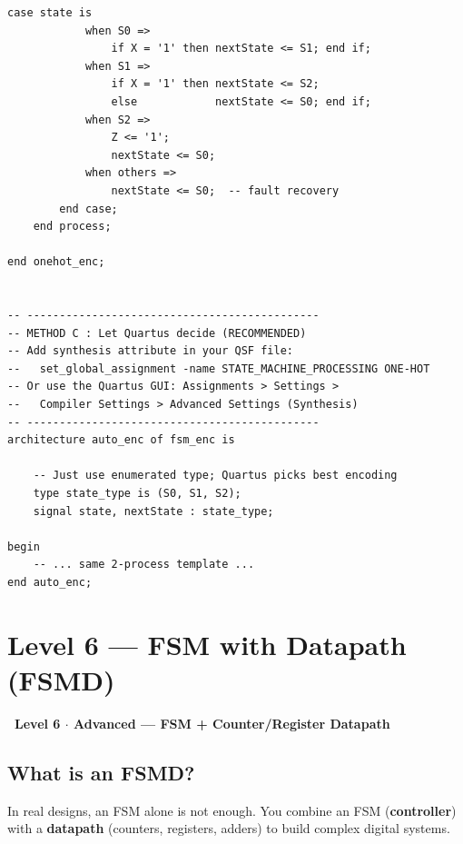 \documentclass[12pt,a4paper]{article}
\newcommand{\faStar}{\ding{72}}
\newcommand{\levelbadge}[2]{%
  \begin{tcolorbox}[colback=#2!15, colframe=#2, arc=20pt,
    left=4pt, right=4pt, top=2pt, bottom=2pt,
    width=\linewidth, boxrule=1pt]
    \centering\sffamily\bfseries\large #1
  \end{tcolorbox}%
}
\begin{document}
\begin{tcolorbox}[vhdlbox, title={Level 5 --- state\_encoding.vhd}]
\begin{lstlisting}[style=vhdlstyle]
        case state is
            when S0 =>
                if X = '1' then nextState <= S1; end if;
            when S1 =>
                if X = '1' then nextState <= S2;
                else            nextState <= S0; end if;
            when S2 =>
                Z <= '1';
                nextState <= S0;
            when others =>
                nextState <= S0;  -- fault recovery
        end case;
    end process;

end onehot_enc;


-- ---------------------------------------------
-- METHOD C : Let Quartus decide (RECOMMENDED)
-- Add synthesis attribute in your QSF file:
--   set_global_assignment -name STATE_MACHINE_PROCESSING ONE-HOT
-- Or use the Quartus GUI: Assignments > Settings >
--   Compiler Settings > Advanced Settings (Synthesis)
-- ---------------------------------------------
architecture auto_enc of fsm_enc is

    -- Just use enumerated type; Quartus picks best encoding
    type state_type is (S0, S1, S2);
    signal state, nextState : state_type;

begin
    -- ... same 2-process template ...
end auto_enc;
\end{lstlisting}
\end{tcolorbox}

\newpage

\section{Level 6 --- FSM with Datapath (FSMD)}

\levelbadge{\faStar\ Level 6 $\cdot$ Advanced --- FSM + Counter/Register Datapath}{accentred}

\subsection{What is an FSMD?}

In real designs, an FSM alone is not enough. You combine an FSM
(\textbf{controller}) with a \textbf{datapath} (counters, registers,
adders) to build complex digital systems.
\end{document}
